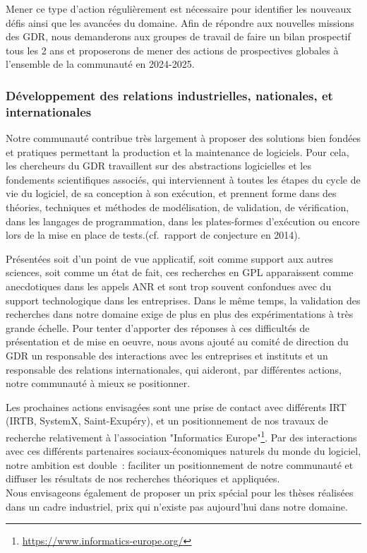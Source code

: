 \documentclass[11pt]{article}
\newcommand{\mynote}[3][black]{\textcolor{#1}{\fbox{\bfseries\sffamily\scriptsize{#2}}
{\small$\blacktriangleright$\textsf{\emph{#3}}$\blacktriangleleft$}}}
\newcommand{\TODO}[1]{\mynote[red]{TODO}{#1}}
\newcommand{\eg}[0]{\emph{e.g.},~}
\newcommand{\cf}[0]{cf.~}
\begin{document}
Mener ce type d'action régulièrement est
nécessaire pour identifier les nouveaux défis ainsi que les avancées du
domaine. 
Afin de répondre aux nouvelles missions des GDR, nous demanderons aux groupes de travail de faire un bilan prospectif tous les 2 ans et proposerons de mener des actions de prospectives globales à l'ensemble de la communauté en 2024-2025.


\subsubsection{Développement des relations industrielles, nationales, et internationales}
Notre communauté contribue très largement à proposer des solutions bien fondées et pratiques permettant la production et la maintenance de logiciels. 
Pour cela, les chercheurs du GDR travaillent sur des abstractions logicielles et les fondements scientifiques
associés, qui interviennent à toutes les étapes du cycle de vie du logiciel, de sa conception à son exécution, et prennent forme dans des théories, techniques et
méthodes de modélisation, de validation, de vérification, dans les langages de programmation, dans les
plates-formes d’exécution ou encore lors de la mise en place de tests.(\cf rapport de conjecture en 2014).


Présentées soit d'un point de vue applicatif, soit comme support aux autres sciences, soit comme un état de fait, ces recherches en GPL apparaissent comme anecdotiques dans les appels ANR et sont trop souvent confondues avec du support technologique dans les entreprises. Dans le même temps, la validation des recherches dans notre domaine exige de plus en plus des expérimentations à très grande échelle.
Pour tenter d'apporter des réponses à ces difficultés de présentation et de mise en oeuvre, nous avons ajouté au comité de direction du GDR un responsable des interactions avec les entreprises et instituts et un responsable des relations internationales, qui aideront, par différentes actions, notre communauté à mieux se positionner.

Les prochaines actions envisagées sont une prise de contact avec différents IRT (IRTB, SystemX, Saint-Exupéry), et un positionnement de nos travaux de recherche relativement à l'association "Informatics Europe"\footnote{\url{https://www.informatics-europe.org/}}.
Par des interactions avec ces différents partenaires sociaux-économiques naturels du monde du logiciel, notre ambition est double~: faciliter un positionnement de notre communauté et diffuser les résultats de nos recherches théoriques et appliquées.\\
Nous envisageons également de proposer un prix spécial pour les thèses réalisées dans un cadre industriel, prix qui n'existe pas aujourd'hui dans notre domaine.
\end{document}
